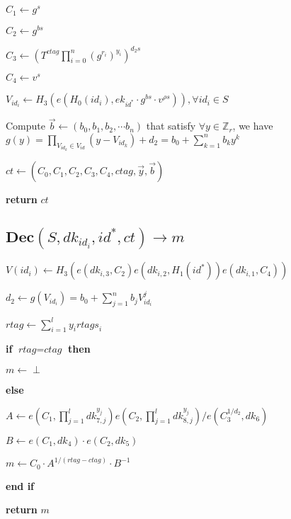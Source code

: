 \documentclass[a4paper]{article}
\begin{document}
$C_1 \gets g^s$

$C_2 \gets g^{bs}$

$C_3 \gets \left(T^{\textit{ctag}}\prod\limits_{i = 0}^n (g^{r_i})^{y_i}\right)^{d_2 s}$

$C_4 \gets v^s$

$V_{\textit{id}_i} \gets H_3(e(H_0(\textit{id}_i), \textit{ek}_{\textit{id}^*} \cdot g^{bs} \cdot v^{\rho s})), \forall \textit{id}_i \in S$

Compute $\vec{b} \gets (b_0, b_1, b_2, \cdots b_n)$ that satisfy $\forall y \in \mathbb{Z}_r$, we have $g(y) = \prod\limits_{V_{\textit{id}_k} \in V_{\textit{id}}} (y - V_{\textit{id}_k}) + d_2 = b_0 + \sum\limits_{k = 1}^n b_k y^k$

$\textit{ct} \gets (C_0, C_1, C_2, C_3, C_4, \textit{ctag}, \vec{y}, \vec{b})$

\textbf{return} $\textit{ct}$

\subsection{$\textbf{Dec}(S, \textit{dk}_{\textit{id}_i}, \textit{id}^*, \textit{ct}) \rightarrow m$}

$V(\textit{id}_i) \gets H_3(e(\textit{dk}_{i, 3}, C_2)e(\textit{dk}_{i, 2}, H_1(\textit{id}^*))e(\textit{dk}_{i, 1}, C_4))$

$d_2 \gets g(V_{\textit{id}_i}) = b_0 + \sum\limits_{j = 1}^n b_j V_{\textit{id}_i}^j$

$\textit{rtag} \gets \sum\limits_{i = 1}^l y_i \textit{rtags}_i$

\textbf{if} $\textit{rtag} = \textit{ctag}$ \textbf{then}

	\quad$m \gets \perp$

\textbf{else}

	\quad$A \gets e\left(C_1, \prod\limits_{j = 1}^l \textit{dk}_{7, j}^{y_j}\right)e\left(C_2, \prod\limits_{j = 1}^l \textit{dk}_{8, j}^{y_j}\right) / e(C_3^{1 / d_2}, \textit{dk}_6)$

	\quad$B \gets e(C_1, \textit{dk}_4) \cdot e(C_2, \textit{dk}_5)$

	\quad$m \gets C_0 \cdot A^{1 / (\textit{rtag} - \textit{ctag})} \cdot B^{-1}$

\textbf{end if}

\textbf{return} $m$
\end{document}
